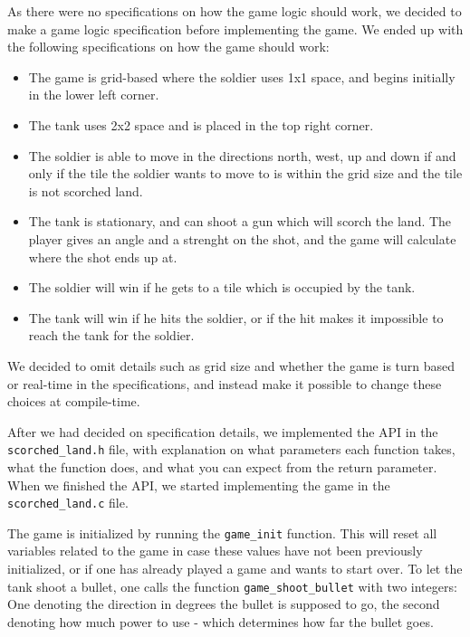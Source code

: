 As there were no specifications on how the game logic should work, we
decided to make a game logic specification before implementing the game.
We ended up with the following specifications on how the game should
work:
\begin{itemize}
    \item The game is grid-based where the soldier uses 1x1 space, and
            begins initially in the lower left corner.
    \item The tank uses 2x2 space and is placed in the top right corner.
    \item The soldier is able to move in the directions north, west, up
            and down if and only if the tile the soldier wants to move
            to is within the grid size and the tile is not scorched land.
    \item The tank is stationary, and can shoot a gun which will scorch
            the land. The player gives an angle and a strenght on the
            shot, and the game will calculate where the shot ends up at.
    \item The soldier will win if he gets to a tile which is
            occupied by the tank.
    \item The tank will win if he hits the soldier, or if the hit makes
            it impossible to reach the tank for the soldier.
\end{itemize}

We decided to omit details such as grid size and whether the game is
turn based or real-time in the specifications, and instead make it
possible to change these choices at compile-time.

After we had decided on specification details, we implemented the
API in the \texttt{scorched\_land.h} file, with explanation on what
parameters each function takes, what the function does, and what you can
expect from the return parameter. When we finished the API, we started
implementing the game in the \texttt{scorched\_land.c} file.

The game is initialized by running the \texttt{game\_init} function.
This will reset all variables related to the game in case these values
have not been previously initialized, or if one has already played a
game and wants to start over. To let the tank shoot a bullet, one calls
the function \texttt{game\_shoot\_bullet} with two integers: One
denoting the direction in degrees the bullet is supposed to go, the
second denoting how much power to use - which determines how far the
bullet goes.

